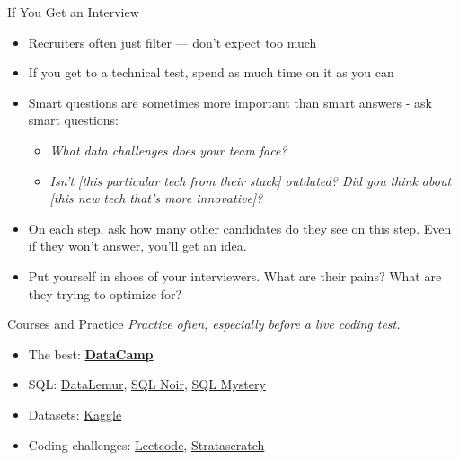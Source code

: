\documentclass[10pt,a4paper]{article}
\begin{document}
\begin{multicols}{3}
\begin{textboxGreen}{If You Get an Interview}
\begin{itemize}
    \item Recruiters often just filter --- don't expect too much
    \item If you get to a technical test, spend as much time on it as you can
    \item Smart questions are sometimes more important than smart answers - ask smart questions:
    \begin{itemize}
        \item \emph{What data challenges does your team face?}
        \item \emph{Isn't [this particular tech from their stack] outdated? Did you think about [this new tech that's more innovative]?}
    \end{itemize}
    \item On each step, ask how many other candidates do they see on this step. Even if they won't answer, you'll get an idea.
    \item Put yourself in shoes of your interviewers. What are their pains? What are they trying to optimize for?
\end{itemize}
\end{textboxGreen}

\begin{textboxYellow}{Courses and Practice}
\emph{Practice often, especially before a live coding test.}

\begin{itemize}
    \item The best: \href{https://datacamp.com/}{\textbf{DataCamp}}
    \item SQL: \href{https://datalemur.com/}{DataLemur}, \href{https://www.sqlnoir.com/}{SQL Noir}, \href{https://mystery.knightlab.com/}{SQL Mystery}
    \item Datasets: \href{https://www.kaggle.com/}{Kaggle}
    \item Coding challenges: \href{https://leetcode.com/}{Leetcode}, \href{https://www.stratascratch.com/}{Stratascratch}
\end{itemize}
\end{textboxYellow}


\end{multicols}
\end{document}
